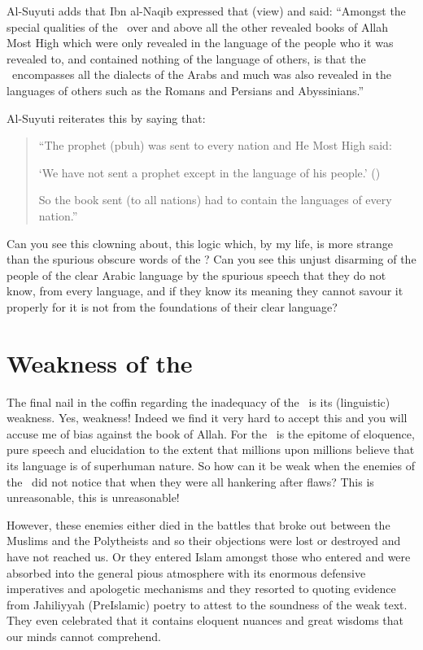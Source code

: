 \documentclass[12pt]{memoir}
\begin{document}
Al-Suyuti adds that Ibn al-Naqib expressed that (view) and said:
“Amongst the special qualities of the \Quran\ over
and above all the other revealed books of Allah Most High
which were only revealed in the language of the people who it was revealed to,
and contained nothing of the language of others,
is that the \Quran\ encompasses all the dialects of the Arabs
and much was also revealed in the languages of others
such as the Romans and Persians and Abyssinians.”\fnmark


Al-Suyuti reiterates this by saying that:

\begin{quote}
“The prophet (pbuh) was sent to every nation and He Most High said:

‘We have not sent a prophet except in the language of his people.’
()

So the book sent (to all nations) had to contain
the languages of every nation.”\fnmark
\end{quote}


Can you see this clowning about, this logic which, by my life,
is more strange than the spurious obscure words of the \Quran?
Can you see this unjust disarming of the people of the clear Arabic language
by the spurious speech that they do not know, from every language,
and if they know its meaning they cannot savour it properly
for it is not from the foundations of their clear language?


\section{Weakness of the \Quran}

The final nail in the coffin regarding the inadequacy of the \Quran\
is its (linguistic) weakness.
Yes, weakness! Indeed we find it very hard to accept this
and you will accuse me of bias against the book of Allah.
For the \Quran\ is the epitome of eloquence, pure speech and elucidation
to the extent that millions upon millions believe
that its language is of super\–human nature.
So how can it be weak when the enemies of the \Quran\ did not notice
that when they were all hankering after flaws?
This is unreasonable, this is unreasonable!

However, these enemies either died in the battles that broke out
between the Muslims and the Polytheists and so their objections were lost
or destroyed and have not reached us.
Or they entered Islam amongst those who entered and were absorbed
into the general pious atmosphere with its enormous defensive imperatives
and apologetic mechanisms and they resorted to quoting evidence from
Jahiliyyah (Pre\–Islamic) poetry to attest to the soundness of the weak text.
They even celebrated that it contains eloquent nuances and great wisdoms
that our minds cannot comprehend.
\end{document}
